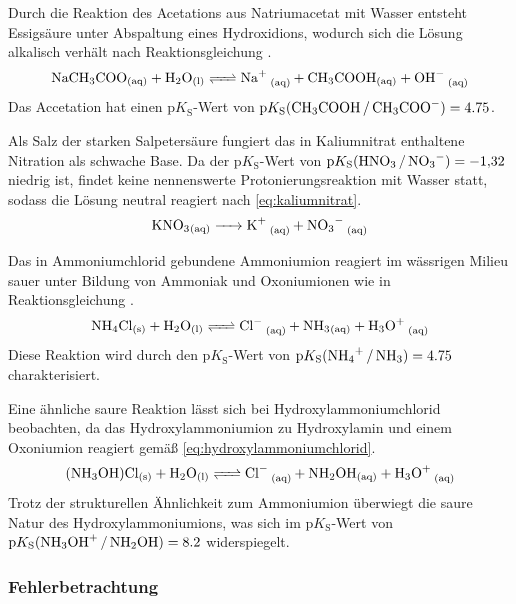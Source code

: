 Durch die Reaktion des Acetations aus Natriumacetat mit Wasser entsteht Essigsäure unter Abspaltung eines Hydroxidions, wodurch sich die Lösung alkalisch verhält nach Reaktionsgleichung .
\begin{equation}
    \ce{NaCH3COO_{(aq)} + H2O_{(l)} <=> Na+ _{(aq)} + CH3COOH_{(aq)} + OH- _{(aq)}}
    \label{eq:natriumacetat}
\end{equation}
Das Accetation hat einen $\mathrm{p}K_{\mathrm{S}}$-Wert von $\mathrm{p}K_{\mathrm{S}}\ce{(CH3COOH / CH3COO^-)}=\SI{4.75}{}$. \cite{pKs_Chemie}


Als Salz der starken Salpetersäure fungiert das in Kaliumnitrat enthaltene Nitration als schwache Base. Da der $\mathrm{p}K_{\mathrm{S}}$-Wert von $\mathrm{p}K_{\mathrm{S}}\ce{(HNO3 / NO3^-)} = -1{,}32$ niedrig ist, findet keine nennenswerte Protonierungsreaktion mit Wasser statt, sodass die Lösung neutral reagiert nach \eqref{eq:kaliumnitrat}.
\begin{equation}
    \ce{KNO3_{(aq)} -> K+ _{(aq)} + NO3- _{(aq)}}
    \label{eq:kaliumnitrat}
\end{equation}


Das in Ammoniumchlorid gebundene Ammoniumion reagiert im wässrigen Milieu sauer unter Bildung von Ammoniak und Oxoniumionen wie in Reaktionsgleichung .
\begin{equation}
    \ce{NH4Cl_{(s)} + H2O_{(l)} <=> Cl- _{(aq)} + NH3_{(aq)} + H3O+ _{(aq)}}
    \label{eq:ammoniumchlorid}
\end{equation}
Diese Reaktion wird durch den $\mathrm{p}K_{\mathrm{S}}$-Wert von $\mathrm{p}K_{\mathrm{S}}\ce{(NH4+ / NH3)} = \SI{4,75}{}$ charakterisiert. \cite{pKs_Chemie}


Eine ähnliche saure Reaktion lässt sich bei Hydroxylammoniumchlorid beobachten, da das Hydroxylammoniumion zu Hydroxylamin und einem Oxoniumion reagiert gemäß \eqref{eq:hydroxylammoniumchlorid}.
\begin{equation}
    \ce{(NH3OH)Cl_{(s)} + H2O_{(l)} <=> Cl- _{(aq)} + NH2OH_{(aq)} + H3O+ _{(aq)}}
    \label{eq:hydroxylammoniumchlorid}
\end{equation}
Trotz der strukturellen Ähnlichkeit zum Ammoniumion überwiegt die saure Natur des Hydroxylammoniumions, was sich im $\mathrm{p}K_{\mathrm{S}}$-Wert von $\mathrm{p}K_{\mathrm{S}}\ce{(NH3OH+ / NH2OH)} = \SI{8,2}{}$ widerspiegelt. \cite{pKs_Chemie}


\subsubsection{Fehlerbetrachtung}

